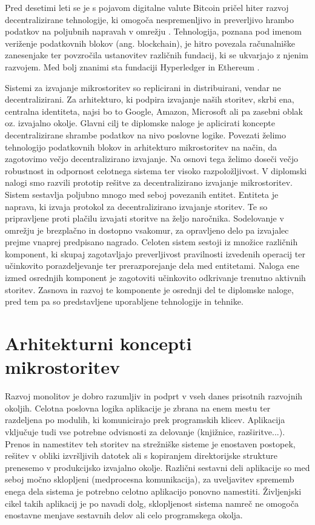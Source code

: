\documentclass[a4paper, 12pt]{book}
\begin{document}
Pred desetimi leti se je s pojavom digitalne valute Bitcoin pričel hiter razvoj decentralizirane tehnologije, ki omogoča nespremenljivo in preverljivo hrambo podatkov na poljubnih napravah v omrežju \cite{nakamoto2008bitcoin}.
Tehnologija, poznana pod imenom veriženje podatkovnih blokov (ang. blockchain), je hitro povezala računalniške zanesenjake ter povzročila ustanovitev različnih fundacij, ki se ukvarjajo z njenim razvojem.
Med bolj znanimi sta fundaciji Hyperledger in Ethereum \cite{hyperledgerWeb, ethereumweb}.

Sistemi za izvajanje mikrostoritev so replicirani in distribuirani, vendar ne decentralizirani.
Za arhitekturo, ki podpira izvajanje naših storitev, skrbi ena, centralna identiteta, najsi bo to Google, Amazon, Microsoft ali pa zasebni oblak oz. izvajalno okolje.
Glavni cilj te diplomske naloge je aplicirati koncepte decentralizirane shrambe podatkov na nivo poslovne logike.
Povezati želimo tehnologijo podatkovnih blokov in arhitekturo mikrostoritev na način, da zagotovimo večjo decentralizirano izvajanje. 
Na osnovi tega želimo doseči večjo robustnost in odpornost celotnega sistema ter visoko razpoložljivost.
V diplomski nalogi smo razvili prototip rešitve za decentralizirano izvajanje mikrostoritev.
Sistem sestavlja poljubno mnogo med seboj povezanih entitet.
Entiteta je naprava, ki izvaja protokol za decentralizirano izvajanje storitev.
Te so pripravljene proti plačilu izvajati storitve na željo naročnika.
Sodelovanje v omrežju je brezplačno in dostopno vsakomur, za opravljeno delo pa izvajalec prejme vnaprej predpisano nagrado.
Celoten sistem sestoji iz množice različnih komponent, ki skupaj zagotavljajo preverljivost pravilnosti izvedenih operacij ter učinkovito porazdeljevanje ter prerazporejanje dela med entitetami.
Naloga ene izmed osrednjih komponent je zagotoviti učinkovito odkrivanje trenutno aktivnih storitev.
Zasnova in razvoj te komponente je osrednji del te diplomske naloge, pred tem pa so predstavljene uporabljene tehnologije in tehnike.

\chapter{Arhitekturni koncepti mikrostoritev}
\label{ch1}

Razvoj monolitov je dobro razumljiv in podprt v vseh danes prisotnih razvojnih okoljih.
Celotna poslovna logika aplikacije je zbrana na enem mestu ter razdeljena po modulih, ki komunicirajo prek programskih klicev.
Aplikacija vključuje tudi vse potrebne odvisnosti za delovanje (knjižnice, razširitve...).
Prenos in namestitev teh storitev na strežniške sisteme je enostaven postopek, rešitev v obliki izvršljivih datotek ali s kopiranjem direktorijske strukture prenesemo v produkcijsko izvajalno okolje.
Različni sestavni deli aplikacije so med seboj močno sklopljeni (medprocesna komunikacija), za uveljavitev sprememb enega dela sistema je potrebno celotno aplikacijo ponovno namestiti.
Življenjski cikel takih aplikacij je po navadi dolg, sklopljenost sistema namreč ne omogoča enostavne menjave sestavnih delov ali celo programskega okolja.
\end{document}
